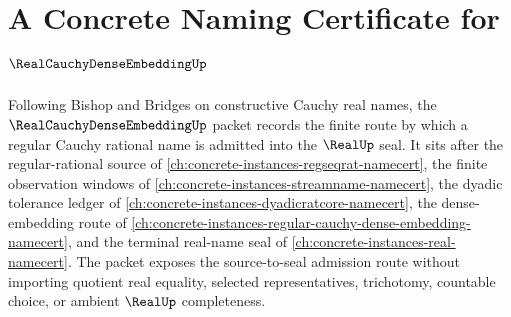 \chapter{A Concrete Naming Certificate for $\RealCauchyDenseEmbeddingUp$}
\label{ch:concrete-instances-real-cauchy-dense-embedding-namecert}

Following Bishop and Bridges on constructive Cauchy real names, the $\RealCauchyDenseEmbeddingUp$ packet records the finite route by which a regular Cauchy rational name is admitted into the $\RealUp$ seal. It sits after the regular-rational source of \autoref{ch:concrete-instances-regseqrat-namecert}, the finite observation windows of \autoref{ch:concrete-instances-streamname-namecert}, the dyadic tolerance ledger of \autoref{ch:concrete-instances-dyadicratcore-namecert}, the dense-embedding route of \autoref{ch:concrete-instances-regular-cauchy-dense-embedding-namecert}, and the terminal real-name seal of \autoref{ch:concrete-instances-real-namecert}. The packet exposes the source-to-seal admission route without importing quotient real equality, selected representatives, trichotomy, countable choice, or ambient $\RealUp$ completeness.

